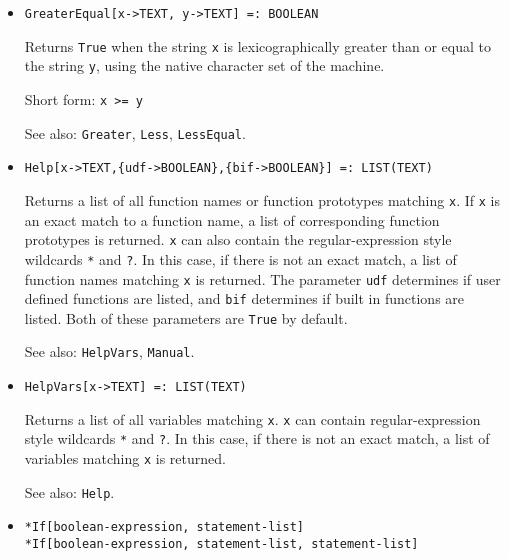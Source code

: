 \begin{itemize}
\item{}
\protect \large \begin{verbatim}
GreaterEqual[x->TEXT, y->TEXT] =: BOOLEAN
\end{verbatim}\normalsize

\bd
Returns \verb+True+ when the string \verb+x+ is lexicographically greater than
or equal to the string \verb+y+, using the native character set of the
machine.
\item
[Short form:] \verb+x >= y+
\item
[See also:] {\tt Greater}, {\tt Less}, {\tt LessEqual}.
\ed



\item{}
\protect \large \begin{verbatim}
Help[x->TEXT,{udf->BOOLEAN},{bif->BOOLEAN}] =: LIST(TEXT)
\end{verbatim}\normalsize

\bd 
Returns a list of all function names or function prototypes matching
\verb+x+.  If \verb+x+ is an exact match to a function name, a list of
corresponding function prototypes is returned.  \verb+x+ can also
contain the regular-expression style wildcards \verb+*+ and \verb+?+.
In this case, if there is not an exact match, a list of function names
matching \verb+x+ is returned.  The parameter \verb+udf+ determines if
user defined functions are listed, and \verb+bif+ determines if built
in functions are listed.  Both of these parameters are \verb+True+ by
default.
\item
[See also:] \verb+HelpVars+, \verb+Manual+.
\ed

\item{}
\protect \large \begin{verbatim}
HelpVars[x->TEXT] =: LIST(TEXT)
\end{verbatim}\normalsize

\bd 
Returns a list of all variables matching \verb+x+.  \verb+x+ can
contain regular-expression style wildcards \verb+*+ and \verb+?+. 
In this case,
if there is not an exact match, a list of variables matching \verb+x+
is returned.
\item [See also:] \verb+Help+.
\ed


\item{} 
\protect \large \begin{verbatim}
*If[boolean-expression, statement-list]
*If[boolean-expression, statement-list, statement-list]
\end{verbatim} \normalsize
  

\end{itemize}
